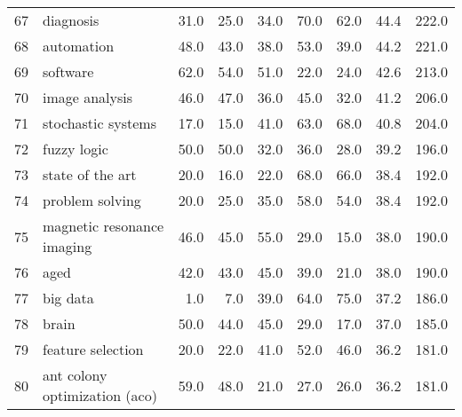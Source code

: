 \begin{tabular}{llrrrrrrr}
67 &                                diagnosis &    31.0 &    25.0 &    34.0 &    70.0 &    62.0 &    44.4 &   222.0 \\
68 &                               automation &    48.0 &    43.0 &    38.0 &    53.0 &    39.0 &    44.2 &   221.0 \\
69 &                                 software &    62.0 &    54.0 &    51.0 &    22.0 &    24.0 &    42.6 &   213.0 \\
70 &                           image analysis &    46.0 &    47.0 &    36.0 &    45.0 &    32.0 &    41.2 &   206.0 \\
71 &                       stochastic systems &    17.0 &    15.0 &    41.0 &    63.0 &    68.0 &    40.8 &   204.0 \\
72 &                              fuzzy logic &    50.0 &    50.0 &    32.0 &    36.0 &    28.0 &    39.2 &   196.0 \\
73 &                         state of the art &    20.0 &    16.0 &    22.0 &    68.0 &    66.0 &    38.4 &   192.0 \\
74 &                          problem solving &    20.0 &    25.0 &    35.0 &    58.0 &    54.0 &    38.4 &   192.0 \\
75 &               magnetic resonance imaging &    46.0 &    45.0 &    55.0 &    29.0 &    15.0 &    38.0 &   190.0 \\
76 &                                     aged &    42.0 &    43.0 &    45.0 &    39.0 &    21.0 &    38.0 &   190.0 \\
77 &                                 big data &     1.0 &     7.0 &    39.0 &    64.0 &    75.0 &    37.2 &   186.0 \\
78 &                                    brain &    50.0 &    44.0 &    45.0 &    29.0 &    17.0 &    37.0 &   185.0 \\
79 &                        feature selection &    20.0 &    22.0 &    41.0 &    52.0 &    46.0 &    36.2 &   181.0 \\
80 &            ant colony optimization (aco) &    59.0 &    48.0 &    21.0 &    27.0 &    26.0 &    36.2 &   181.0 \\
\bottomrule
\end{tabular}
